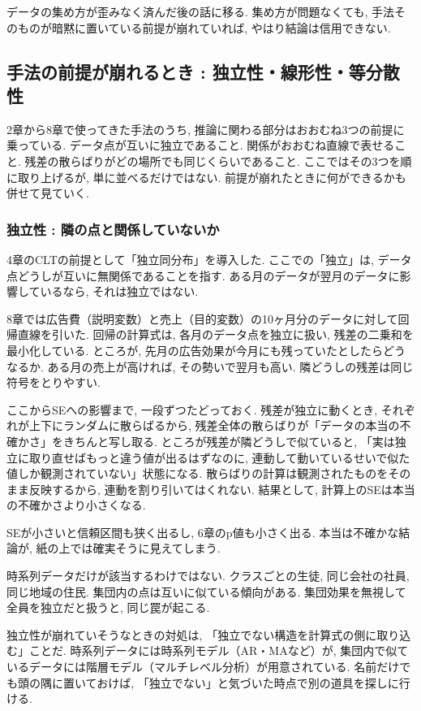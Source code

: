 データの集め方が歪みなく済んだ後の話に移る. 集め方が問題なくても, 手法そのものが暗黙に置いている前提が崩れていれば, やはり結論は信用できない.


\subsection{手法の前提が崩れるとき : 独立性・線形性・等分散性}

2章から8章で使ってきた手法のうち, 推論に関わる部分はおおむね3つの前提に乗っている.
データ点が互いに独立であること. 関係がおおむね直線で表せること. 残差の散らばりがどの場所でも同じくらいであること.
ここではその3つを順に取り上げるが, 単に並べるだけではない. 前提が崩れたときに何ができるかも併せて見ていく.

\subsubsection*{独立性 : 隣の点と関係していないか}

4章のCLTの前提として「独立同分布」を導入した.
ここでの「独立」は, データ点どうしが互いに無関係であることを指す.
ある月のデータが翌月のデータに影響しているなら, それは独立ではない.

8章では広告費（説明変数）と売上（目的変数）の10ヶ月分のデータに対して回帰直線を引いた.
回帰の計算式は, 各月のデータ点を独立に扱い, 残差の二乗和を最小化している.
ところが, 先月の広告効果が今月にも残っていたとしたらどうなるか.
ある月の売上が高ければ, その勢いで翌月も高い. 隣どうしの残差は同じ符号をとりやすい.

ここからSEへの影響まで, 一段ずつたどっておく.
残差が独立に動くとき, それぞれが上下にランダムに散らばるから, 残差全体の散らばりが「データの本当の不確かさ」をきちんと写し取る.
ところが残差が隣どうしで似ていると, 「実は独立に取り直せばもっと違う値が出るはずなのに, 連動して動いているせいで似た値しか観測されていない」状態になる.
散らばりの計算は観測されたものをそのまま反映するから, 連動を割り引いてはくれない.
結果として, 計算上のSEは本当の不確かさより小さくなる.

SEが小さいと信頼区間も狭く出るし, 6章のp値も小さく出る.
本当は不確かな結論が, 紙の上では確実そうに見えてしまう.

時系列データだけが該当するわけではない.
クラスごとの生徒, 同じ会社の社員, 同じ地域の住民. 集団内の点は互いに似ている傾向がある.
集団効果を無視して全員を独立だと扱うと, 同じ罠が起こる.

独立性が崩れていそうなときの対処は, 「独立でない構造を計算式の側に取り込む」ことだ.
時系列データには時系列モデル（AR・MAなど）が, 集団内で似ているデータには階層モデル（マルチレベル分析）が用意されている.
名前だけでも頭の隅に置いておけば, 「独立でない」と気づいた時点で別の道具を探しに行ける.


